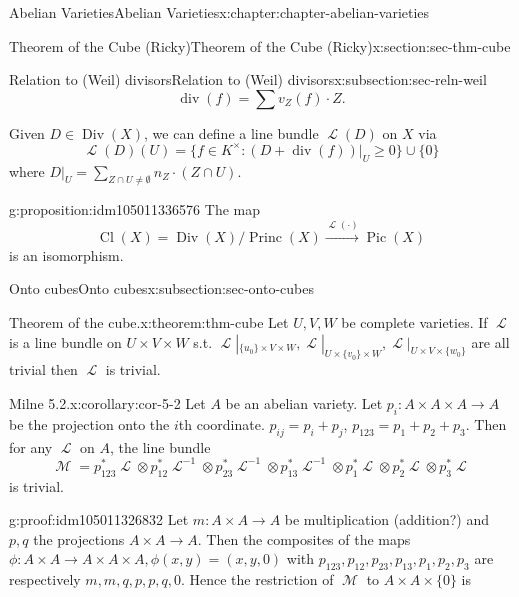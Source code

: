 \documentclass[oneside,10pt,]{book}
\numberwithin{equation}{section}
\newcommand{\sheaf}[1]{\operatorname{\mathcal{#1}}}
\DeclareMathOperator{\divisor}{div}
\DeclareMathOperator{\Div}{Div}
\DeclareMathOperator{\Cl}{Cl}
\DeclareMathOperator{\Pic}{Pic}
\DeclareMathOperator{\Princ}{Princ}
\begin{document}
\begin{chapterptx}{Abelian Varieties}{}{Abelian Varieties}{}{}{x:chapter:chapter-abelian-varieties}
\begin{sectionptx}{Theorem of the Cube (Ricky)}{}{Theorem of the Cube (Ricky)}{}{}{x:section:sec-thm-cube}
\begin{subsectionptx}{Relation to (Weil) divisors}{}{Relation to (Weil) divisors}{}{}{x:subsection:sec-reln-weil}
\begin{equation*}
\divisor (f) = \sum v_Z(f) \cdot Z\text{.}
\end{equation*}
%
\par
Given \(D \in \Div(X)\), we can define a line bundle \(\sheaf L(D)\) on \(X\) via%
\begin{equation*}
\sheaf L(D)(U) = \{f\in K^\times : (D + \divisor (f))|_U\ge 0 \} \cup \{0\}
\end{equation*}
where \(D|_U = \sum_{Z\cap U\ne \emptyset} n_Z\cdot (Z\cap U)\).%
\begin{proposition}{}{}{g:proposition:idm105011336576}%
The map%
\begin{equation*}
\Cl(X) = \Div(X)/\Princ(X) \xrightarrow{\sheaf L(\cdot)} \Pic(X)
\end{equation*}
is an isomorphism.%
\end{proposition}
\end{subsectionptx}
%
%
\typeout{************************************************}
\typeout{************************************************}
%
\begin{subsectionptx}{Onto cubes}{}{Onto cubes}{}{}{x:subsection:sec-onto-cubes}
\begin{theorem}{Theorem of the cube.}{}{x:theorem:thm-cube}%
Let \(U,V,W\) be complete varieties. If \(\sheaf L \) is a line bundle on \(U\times V\times W\) s.t. \(\sheaf L|_{\{u_0\}\times V\times W},\sheaf L|_{U\times \{v_0\}\times W}, \sheaf L|_{U\times V\times \{w_0\}}\) are all trivial then \(\sheaf L\) is trivial.%
\end{theorem}
\begin{corollary}{Milne 5.2.}{}{x:corollary:cor-5-2}%
Let \(A\) be an abelian variety. Let \(p_i\colon A\times A\times A \to A\) be the projection onto the \(i\)th coordinate. \(p_{ij} = p_i+p_j\), \(p_{123} = p_1+p_2+p_3\). Then for any \(\sheaf L\) on \(A\), the line bundle%
\begin{equation*}
\sheaf M  = p_{123}^*\sheaf L \otimes p_{12}^*\sheaf L^{-1}\otimes p_{23}^*\sheaf L^{-1}\otimes p_{13}^*\sheaf L^{-1} \otimes p_1^*\sheaf L \otimes p_2^*\sheaf L \otimes p_3^*\sheaf L
\end{equation*}
is trivial.%
\end{corollary}
\begin{proofptx}{}{g:proof:idm105011326832}
Let  \(m \colon A\times A \to A\) be multiplication (addition?) and \(p,q\) the projections \(A\times A \to A\). Then the composites of the maps \(\phi\colon A\times A \to A \times A \times A, \phi(x,y) = (x,y,0)\) with \(p_{123}, p_{12}, p_{23}, p_{13}, p_1, p_2, p_3\) are respectively \(m,m,q, p, p, q, 0\). Hence the restriction of \(\sheaf M\) to \(A \times A \times \{0\}\) is%

\end{proofptx}
\end{subsectionptx}
\end{sectionptx}
\end{chapterptx}
\end{document}
